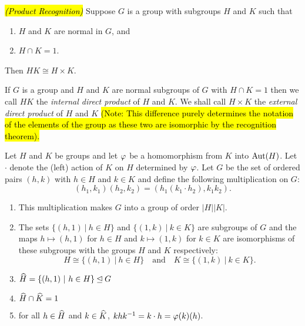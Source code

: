 \nl

\begin{thm}\hl{\textit{(Product Recognition)}} Suppose $G$ is a group with subgroups $H$ and $K$ such that
\begin{enumerate}
\item $H$ and $K$ are normal in $G$, and
\item $H\cap K = 1$.
\end{enumerate}
Then $HK\cong H\times K$.
\end{thm}

\nl

\begin{defn}
If $G$ is a group and $H$ and $K$ are normal subgroups of $G$ with $H\cap K = 1$ then we call $HK$ the \textit{internal direct product} of $H$ and $K$. We shall call $H\times K$ the \textit{external direct product} of $H$ and $K$ \hl{(Note: This difference purely determines the notation of the elements of the group as these two are isomorphic by the recognition theorem).}
\end{defn}

\nl

\begin{thm}\label{con. semi}
Let $H$ and $K$ be groups and let $\varphi$ be a homomorphism from $K$ into $\text{Aut}(H)$. Let $\cdot$ denote the (left) action of $K$ on $H$ determined by $\varphi$. Let $G$ be the set of ordered pairs $(h,k)$ with $h\in H$ and $k\in K$ and define the following multiplication on $G$:
\[(h_1,k_1)(h_2,k_2) = (h_1(k_1\cdot h_2), k_1k_2).\]
\begin{enumerate}
\item This multiplication makes $G$ into a group of order $|H||K|$.
\item The sets $\{(h, 1)\ |\ h\in H\}$ and $\{(1,k)\ |\ k\in K\}$ are subgroups of $G$ and the maps $h\mapsto (h,1)$ for $h\in H$ and $k\mapsto (1,k)$ for $k\in K$ are isomorphisms of these subgroups with the groups $H$ and $K$ respectively:
\[H\cong \{(h, 1)\ |\ h\in H\}\quad\text{and}\quad K\cong\{(1,k)\ |\ k\in K\}.\]
\item $\widehat H = \{(h, 1)\ |\ h\in H\}\unlhd G$
\item $\widehat H\cap \widehat K = 1$
\item for all $h\in \widehat H$ and $k\in\widehat K$, $khk^{-1} = k\cdot h = \varphi(k)(h)$.

\end{enumerate}
\end{thm}


\nl

